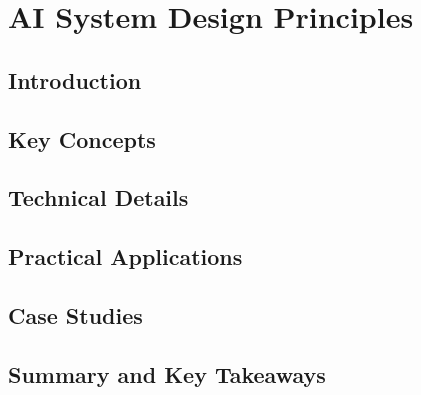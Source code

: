 ﻿%

\chapter{AI System Design Principles}
\label{ch:chapter-08}

\section{Introduction}


\section{Key Concepts}


\section{Technical Details}


\section{Practical Applications}


\section{Case Studies}


\section{Summary and Key Takeaways}


